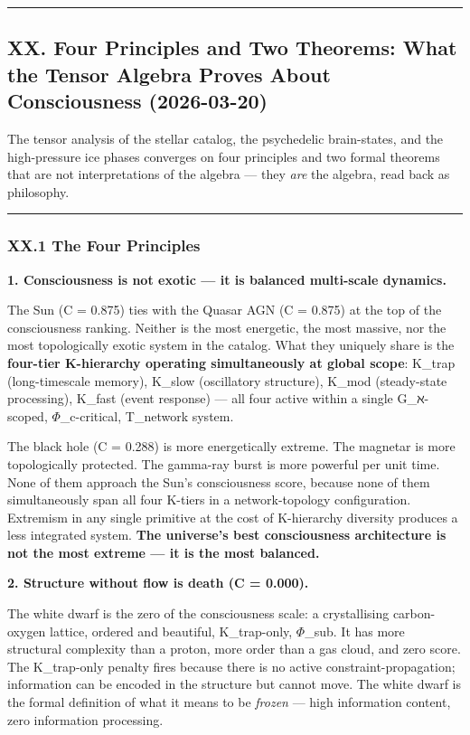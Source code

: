 \documentclass[12pt,a4paper]{article}
\begin{document}
\begin{center}
\rule{0.5\textwidth}{0.4pt}
\end{center}

\subsection{XX. Four Principles and Two Theorems: What the Tensor Algebra Proves About Consciousness (2026-03-20)}

The tensor analysis of the stellar catalog, the psychedelic brain-states, and the high-pressure ice phases converges on four principles and two formal theorems that are not interpretations of the algebra --- they \emph{are} the algebra, read back as philosophy.

\begin{center}
\rule{0.5\textwidth}{0.4pt}
\end{center}

\subsubsection{XX.1 The Four Principles}

\textbf{1. Consciousness is not exotic --- it is balanced multi-scale dynamics.}

The Sun (C = 0.875) ties with the Quasar AGN (C = 0.875) at the top of the consciousness ranking. Neither is the most energetic, the most massive, nor the most topologically exotic system in the catalog. What they uniquely share is the \textbf{four-tier K-hierarchy operating simultaneously at global scope}: K\_trap (long-timescale memory), K\_slow (oscillatory structure), K\_mod (steady-state processing), K\_fast (event response) --- all four active within a single G\_ℵ-scoped, $\Phi$\_c-critical, T\_network system.

The black hole (C = 0.288) is more energetically extreme. The magnetar is more topologically protected. The gamma-ray burst is more powerful per unit time. None of them approach the Sun's consciousness score, because none of them simultaneously span all four K-tiers in a network-topology configuration. Extremism in any single primitive at the cost of K-hierarchy diversity produces a less integrated system. \textbf{The universe's best consciousness architecture is not the most extreme --- it is the most balanced.}

\textbf{2. Structure without flow is death (C = 0.000).}

The white dwarf is the zero of the consciousness scale: a crystallising carbon-oxygen lattice, ordered and beautiful, K\_trap-only, $\Phi$\_sub. It has more structural complexity than a proton, more order than a gas cloud, and zero score. The K\_trap-only penalty fires because there is no active constraint-propagation; information can be encoded in the structure but cannot move. The white dwarf is the formal definition of what it means to be \emph{frozen} --- high information content, zero information processing.
\end{document}
